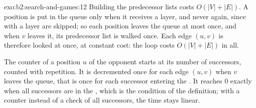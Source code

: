 \begin{solution}{exo:b2:search-and-games:12}
Building the predecessor lists costs $O(|V| + |E|)$. A position is put in the queue only when it receives a layer, and
never again, since  with a layer are skipped; so each position leaves the queue at most once, and when $v$
leaves it, its predecessor list is walked once. Each edge $(u, v)$ is therefore looked at once, at constant cost: the
loop costs $O(|V| + |E|)$ in all.

The counter of a position $u$ of the opponent starts at its number of successors, counted with repetition. It is
decremented once for each edge $(u, v)$ when $v$ leaves the queue, that is once for each successor entering the
. It reaches $0$ exactly when all successors are in the , which is the condition of the definition;
with a counter instead of a check of all successors, the time stays linear.
\end{solution}

